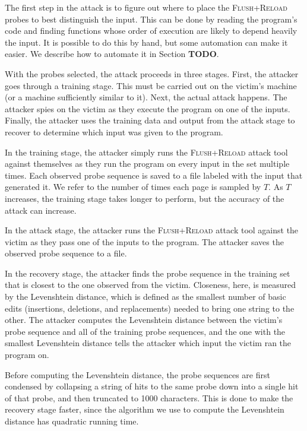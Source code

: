 \documentclass[letterpaper,twocolumn,10pt]{article}
\begin{document}
The first step in the attack is to figure out where to place the
\textsc{Flush+Reload} probes to best distinguish the input. This can be done by
reading the program's code and finding functions whose order of execution are
likely to depend heavily the input. It is possible to do this by hand, but some
automation can make it easier. We describe how to automate it in Section
\textbf{TODO}.

With the probes selected, the attack proceeds in three stages. First, the
attacker goes through a training stage. This must be carried out on the victim's
machine (or a machine sufficiently similar to it). Next, the actual attack happens. The
attacker spies on the victim as they execute the program on one of the inputs.
Finally, the attacker uses the training data and output from the attack stage to
recover to determine which input was given to the program.

In the training stage, the attacker simply runs the \textsc{Flush+Reload} attack
tool against themselves as they run the program on every input in the set
multiple times. Each observed probe sequence is saved to a file labeled with the
input that generated it. We refer to the number of times each page is sampled by
$T$. As $T$ increases, the training stage takes longer to perform, but the
accuracy of the attack can increase.

In the attack stage, the attacker runs the \textsc{Flush+Reload} attack tool
against the victim as they pass one of the inputs to the program. The attacker
saves the observed probe sequence to a file.

In the recovery stage, the attacker finds the probe sequence in the training set
that is closest to the one observed from the victim. Closeness, here, is
measured by the Levenshtein distance\cite{levenshtein1966binary}, which is
defined as the smallest number of basic edits (insertions, deletions, and
replacements) needed to bring one string to the other. The attacker computes the
Levenshtein distance between the victim's probe sequence and all of the training
probe sequences, and the one with the smallest Levenshtein distance tells the
attacker which input the victim ran the program on.

Before computing the Levenshtein distance, the probe sequences are first
condensed by collapsing a string of hits to the same probe down into a single
hit of that probe, and then truncated to 1000 characters. This is done to make
the recovery stage faster, since the algorithm we use to compute the Levenshtein
distance has quadratic running time.
\end{document}
